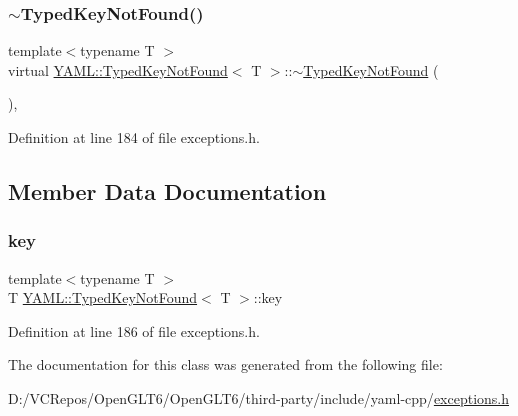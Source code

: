 \subsubsection{\texorpdfstring{$\sim$TypedKeyNotFound()}{~TypedKeyNotFound()}}
{\footnotesize\ttfamily template$<$typename T $>$ \\
virtual \mbox{\hyperlink{class_y_a_m_l_1_1_typed_key_not_found}{Y\+A\+M\+L\+::\+Typed\+Key\+Not\+Found}}$<$ T $>$\+::$\sim$\mbox{\hyperlink{class_y_a_m_l_1_1_typed_key_not_found}{Typed\+Key\+Not\+Found}} (\begin{DoxyParamCaption}{ }\end{DoxyParamCaption})\hspace{0.3cm}{\ttfamily [inline]}, {\ttfamily [virtual]}}



Definition at line 184 of file exceptions.\+h.



\subsection{Member Data Documentation}
\mbox{\label{class_y_a_m_l_1_1_typed_key_not_found_a5ad894d0c3bf1ed295131be1e0543857}} 
\subsubsection{\texorpdfstring{key}{key}}
{\footnotesize\ttfamily template$<$typename T $>$ \\
T \mbox{\hyperlink{class_y_a_m_l_1_1_typed_key_not_found}{Y\+A\+M\+L\+::\+Typed\+Key\+Not\+Found}}$<$ T $>$\+::key}



Definition at line 186 of file exceptions.\+h.



The documentation for this class was generated from the following file\+:\begin{DoxyCompactItemize}
\item 
D\+:/\+V\+C\+Repos/\+Open\+G\+L\+T6/\+Open\+G\+L\+T6/third-\/party/include/yaml-\/cpp/\mbox{\hyperlink{exceptions_8h}{exceptions.\+h}}\end{DoxyCompactItemize}
